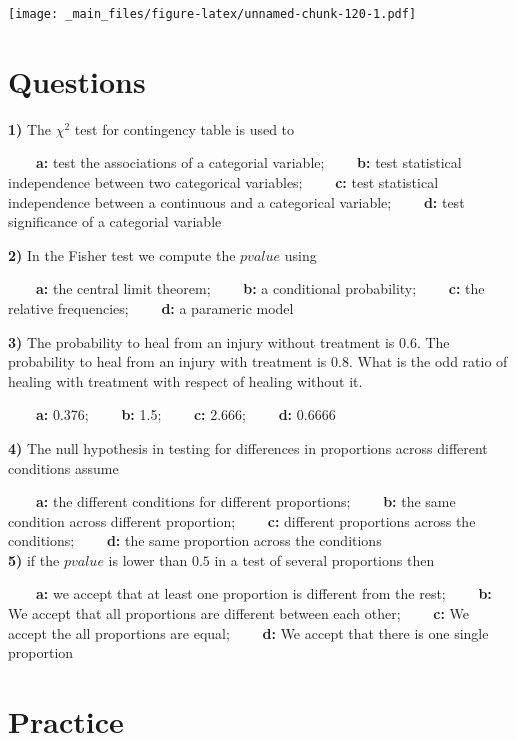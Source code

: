 \documentclass[
]{book}
\begin{document}
\texttt{[image: \_main\_files/figure-latex/unnamed-chunk-120-1.pdf]}

\hypertarget{questions-11}{%
\section{Questions}\label{questions-11}}

\textbf{1)} The \(\chi^2\) test for contingency table is used to

\textbf{\(\qquad\)a:} test the associations of a categorial variable;
\textbf{\(\qquad\)b:} test statistical independence between two categorical variables;
\textbf{\(\qquad\)c:} test statistical independence between a continuous and a categorical variable;
\textbf{\(\qquad\)d:} test significance of a categorial variable

\textbf{2)} In the Fisher test we compute the \(pvalue\) using

\textbf{\(\qquad\)a:} the central limit theorem;
\textbf{\(\qquad\)b:} a conditional probability;
\textbf{\(\qquad\)c:} the relative frequencies;
\textbf{\(\qquad\)d:} a parameric model

\textbf{3)} The probability to heal from an injury without treatment is 0.6. The probability to heal from an injury with treatment is 0.8. What is the odd ratio of healing with treatment with respect of healing without it.

\textbf{\(\qquad\)a:} 0.376;
\textbf{\(\qquad\)b:} 1.5;
\textbf{\(\qquad\)c:} 2.666;
\textbf{\(\qquad\)d:} 0.6666

\textbf{4)} The null hypothesis in testing for differences in proportions across different conditions assume

\textbf{\(\qquad\)a:} the different conditions for different proportions;
\textbf{\(\qquad\)b:} the same condition across different proportion;
\textbf{\(\qquad\)c:} different proportions across the conditions;
\textbf{\(\qquad\)d:} the same proportion across the conditions\\
\textbf{5)} if the \(pvalue\) is lower than \(0.5\) in a test of several proportions then

\textbf{\(\qquad\)a:} we accept that at least one proportion is different from the rest;
\textbf{\(\qquad\)b:} We accept that all proportions are different between each other;
\textbf{\(\qquad\)c:} We accept the all proportions are equal;
\textbf{\(\qquad\)d:} We accept that there is one single proportion

\hypertarget{practice-5}{%
\section{Practice}\label{practice-5}}
\end{document}
